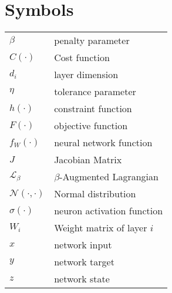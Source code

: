 \documentclass[master=wit,english]{kulemt}
\begin{document}
\section*{Symbols}
\begin{flushleft}
  \renewcommand{\arraystretch}{1.1}
  \begin{tabularx}{\textwidth}{@{}p{12mm}X@{}}
  	$\beta$ & penalty parameter \\
  	$C(\cdot)$ & Cost function \\
 	$d_i$ & layer dimension \\
  	$\eta$ & tolerance parameter \\
 	$h(\cdot)$ & constraint function \\
 	$F(\cdot)$ & objective function \\
    $f_W(\cdot)$ & neural network function \\
    $J$ & Jacobian Matrix \\
    $\mathcal{L}_{\beta}$   & $\beta$-Augmented Lagrangian \\
    $\mathcal{N}(\cdot,\cdot)$ & Normal distribution \\
    $\sigma(\cdot)$ & neuron activation function \\
    $W_i$ & Weight matrix of layer $i$ \\
    $x$ & network input \\
    $y$ & network target \\
    $z$ & network state \\
  \end{tabularx}
\end{flushleft}

\mainmatter








\appendixpage*          %
\appendix




\backmatter


\end{document}
